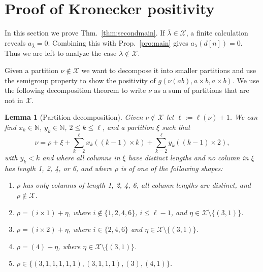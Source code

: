 \documentclass{article}
\numberwithin{equation}{section}
\newtheorem{lemma}[equation]{Lemma}
\theoremstyle{definition}
\def\la{\lambda}
\newcommand{\IN}{\mathbb N}
\newcommand{\exceptions}{{\mathscr{X}}}
\begin{document}
\section{Proof of Kronecker positivity}\label{sec:secondthm}
In this section we prove Thm.~\ref{thm:secondmain}.
If $\bar\la \in \exceptions$, a finite calculation reveals $a_{\bar\la} = 0$.
Combining this with Prop.~\ref{pro:main} gives $a_\la(d[n])=0$.
Thus we are left to analyze the case $\bar\la \notin \exceptions$.

Given a partition $\nu \notin \exceptions$ we want to decompose it into smaller partitions and use the semigroup property to show
the positivity of $g(\nu(ab),a\times b,a\times b)$.
We use the following decomposition theorem to write $\nu$ as a sum of partitions that are not in $\exceptions$.
\begin{lemma}[Partition decomposition]\label{lem:partitiondecomposition}
Given $\nu \notin \exceptions$ let $\ell:=\ell(\nu)+1$.
We can find $x_k \in \IN$, $y_k \in \IN$, $2 \leq k \leq \ell$,
and a partition $\xi$ such that
\[\textstyle
\nu = \rho + \xi + \sum_{k=2}^\ell x_k ((k-1) \times k) + \sum_{k=2}^\ell y_k ((k-1) \times 2),
\]
with $y_k < k$ and
where all columns in $\xi$ have distinct lengths and no column in $\xi$ has length 1, 2, 4, or 6,
and where $\rho$ is of one of the following shapes:
\begin{enumerate}[(1)]
\item $\rho$ has only columns of length 1, 2, 4, 6, all column lengths are distinct, and $\rho \notin \exceptions$.
\item $\rho = (i \times 1)+\eta$, where $i \notin \{1,2,4,6\}$, $i \leq \ell-1$, and $\eta \in \exceptions \setminus \{(3,1)\}$.
\item $\rho = (i \times 2)+\eta$, where $i \in \{2,4,6\}$ and $\eta \in \exceptions \setminus \{(3,1)\}$.
\item $\rho = (4)+\eta$, where $\eta \in \exceptions \setminus \{(3,1)\}$.
\item $\rho \in \{(3,1,1,1,1,1),(3,1,1,1),(3),(4,1)\}$.
\end{enumerate}
\end{lemma}
\end{document}
